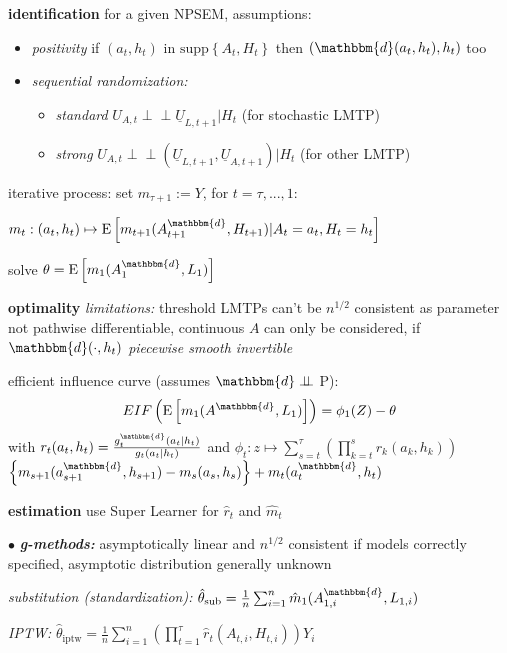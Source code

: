 \documentclass[8pt,twoside]{extarticle}
\newcommand{\indep}{\perp \!\!\! \perp}
\begin{document}
\begin{multicols}{2}
 \textbf{identification} for a given NPSEM, assumptions: 

\begin{itemize}[leftmargin=*, itemsep=0em, topsep=0pt, partopsep=0pt,parsep=0pt]
\item \textit{positivity} if $(a_t,h_t)$ in  $\mathrm{supp}\!\left\{A_t,H_t\right\}$ then $ (\mathbbm{d}(a_t,h_t),h_t) $ too
\item \textit{sequential randomization:} 
\begin{itemize}[leftmargin=*, itemsep=0em, topsep=0pt, partopsep=0pt,parsep=0pt]
\item \textit{standard} $U_{A,t}\indep\underline{U}_{L,t+1}|H_t$ (for stochastic LMTP)
\item \textit{strong}  $U_{A,t}\indep(\underline{U}_{L,t+1},\underline{U}_{A,t+1})|H_t$ (for other LMTP)
\end{itemize}
\end{itemize}

 iterative process: set $m_{\tau+1}:=Y$, for $t=\tau,...,1$:

 $m_t: (a_t,h_t) \mapsto \mathrm{E}\left[m_{t+1}(A_{t+1}^{\mathbbm{d}}, H_{t+1})|A_t=a_t,H_t=h_t\right]$

 solve $\theta = \mathrm{E}\left[m_1(A_1^{\mathbbm{d}},L_1)\right]$


 \textbf{optimality}  \textit{limitations:} threshold LMTPs can't be $n^{1/2}$ consistent as parameter not pathwise differentiable,
continuous $A$ can only be considered, if $\mathbbm{d}(\cdot,h_t)$ \textit{piecewise smooth invertible}

 efficient influence curve (assumes $\mathbbm{d} \indep $ P):
$$EIF\left(\mathrm{E}\left[m_1(A^{\mathbbm{d}}, L_1)\right]\right) = \phi_1(Z) - \theta$$ with
$r_t(a_t, h_t) =\frac{g_t^{\mathbbm{d}}(a_t|h_t)}{g_t(a_t|h_t)}  $ and
$\phi_t: z \mapsto \sum_{s=t}^\tau \left(\prod_{k=t}^s r_k(a_k,h_k)\right)$ $\left\{m_{s+1}(a_{s+1}^{\mathbbm{d}},h_{s+1})-m_s(a_s,h_s)\right\} + m_t(a_t^{\mathbbm{d}},h_t)$

 \textbf{estimation}
use Super Learner for $\hat{r}_t$ and $\hat{m}_t$


 $\bullet$ \textit{\textbf{g-methods:}} asymptotically linear and $n^{1/2}$ consistent if models correctly specified, asymptotic distribution generally unknown

 \textit{substitution (standardization):} $\hat{\theta}_{\text{sub}}=\frac{1}{n} \sum_{i=1}^n \hat{m}_1(A^{\mathbbm{d}}_{1,i},L_{1,i})$

 \textit{IPTW:} $\hat{\theta}_{\text{iptw}}=\frac{1}{n} \sum_{i=1}^n \left(\prod_{t=1}^\tau \hat{r}_t(A_{t,i},H_{t,i})\right)Y_i$




\end{multicols}
\end{document}
